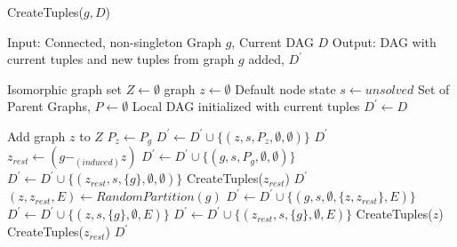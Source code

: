 \begin{algorithm}
\caption{CreateTuples($g,D$)} 
\label{alg:alg102}
\begin{algorithmic}
\STATE Input: Connected, non-singleton Graph $g$, Current DAG $D$
\STATE Output: DAG with current tuples and new tuples from graph $g$ added, $D^{'}$
\end{algorithmic}
\begin{algorithmic}[1]
\STATE Isomorphic graph set $Z \leftarrow \emptyset$
\STATE graph $z  \leftarrow　\emptyset$
\STATE Default node state $s  \leftarrow unsolved$
\STATE Set of Parent Graphs, $P \leftarrow \emptyset$
\STATE Local DAG initialized with current tuples $D^{'} \leftarrow D$

\STATE Add graph $z$ to $Z$ 
\ENDIF
\ENDFOR
{} 
\STATE $P_{z} \leftarrow P_{g}$
\STATE $D^{'} \leftarrow D^{'} \cup \{(z,s,P_z ,\emptyset ,\emptyset)\}$
\RETURN $D^{'}$
\ELSE
{}
\STATE \ $z_{rest}  \leftarrow  (g -_{(induced)} z)$
\STATE $D^{'}  \leftarrow D^{'} \cup \{(g,s,P_g,\emptyset , \emptyset )\}$
\STATE $D^{'}  \leftarrow D^{'} \cup \{(z_{rest},s,\{g\},\emptyset , \emptyset )\}$
\STATE CreateTuples($z_{rest}$)
\RETURN  $D^{'}$
\ENDIF
\ENDFOR
\ENDIF
\ENDWHILE
\STATE $(z,z_{rest},E) \leftarrow RandomPartition(g)$
\STATE $D^{'}  \leftarrow D^{'} \cup \{(g,s,\emptyset,\{z,z_{rest}\},E)\}$
\STATE $D^{'}  \leftarrow D^{'} \cup \{(z,s,\{g\},\emptyset,E)\}$
\STATE $D^{'}  \leftarrow D^{'} \cup \{(z_{rest},s,\{g\},\emptyset ,E)\}$
\STATE CreateTuples($z$)
\STATE CreateTuples($z_{rest}$) 
\RETURN $D^{'}$
\end{algorithmic}
\end{algorithm}


